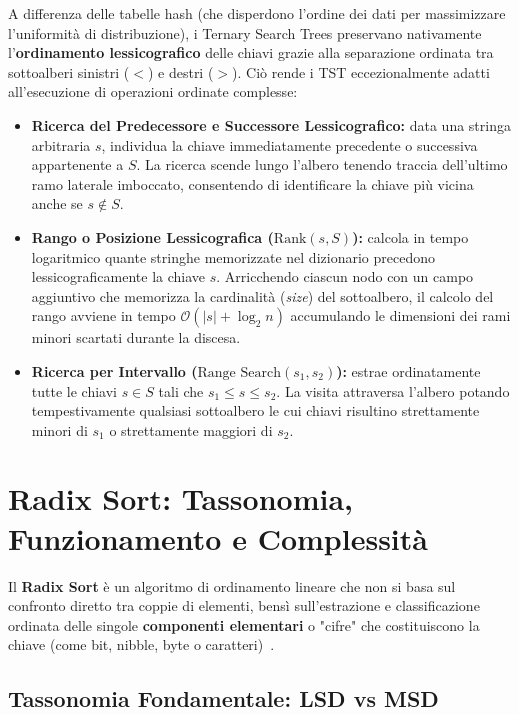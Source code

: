 A differenza delle tabelle hash (che disperdono l'ordine dei dati per massimizzare l'uniformit\`a di distribuzione), i Ternary Search Trees preservano nativamente l'\textbf{ordinamento lessicografico} delle chiavi grazie alla separazione ordinata tra sottoalberi sinistri ($<$) e destri ($>$). Ci\`o rende i TST eccezionalmente adatti all'esecuzione di operazioni ordinate complesse:
\begin{itemize}
  \item \textbf{Ricerca del Predecessore e Successore Lessicografico:} data una stringa arbitraria $s$, individua la chiave immediatamente precedente o successiva appartenente a $S$. La ricerca scende lungo l'albero tenendo traccia dell'ultimo ramo laterale imboccato, consentendo di identificare la chiave pi\`u vicina anche se $s \notin S$.
  \item \textbf{Rango o Posizione Lessicografica ($\text{Rank}(s, S)$):} calcola in tempo logaritmico quante stringhe memorizzate nel dizionario precedono lessicograficamente la chiave $s$. Arricchendo ciascun nodo con un campo aggiuntivo che memorizza la cardinalit\`a (\textit{size}) del sottoalbero, il calcolo del rango avviene in tempo $\mathcal{O}(|s| + \log_2 n)$ accumulando le dimensioni dei rami minori scartati durante la discesa.
  \item \textbf{Ricerca per Intervallo ($\text{Range Search}(s_1, s_2)$):} estrae ordinatamente tutte le chiavi $s \in S$ tali che $s_1 \le s \le s_2$. La visita attraversa l'albero potando tempestivamente qualsiasi sottoalbero le cui chiavi risultino strettamente minori di $s_1$ o strettamente maggiori di $s_2$.
\end{itemize}

\FloatBarrier
\section{Radix Sort: Tassonomia, Funzionamento e Complessità}
\label{sec:radix-sort-tassonomia}

Il \textbf{Radix Sort} \`e un algoritmo di ordinamento lineare che non si basa sul confronto diretto tra coppie di elementi, bens\`i sull'estrazione e classificazione ordinata delle singole \textbf{componenti elementari} o "cifre" che costituiscono la chiave (come bit, nibble, byte o caratteri)~\cite{knuth1998vol3}.

\FloatBarrier
\subsection{Tassonomia Fondamentale: LSD vs MSD}
\label{subsec:tassonomia-lsd-msd}

